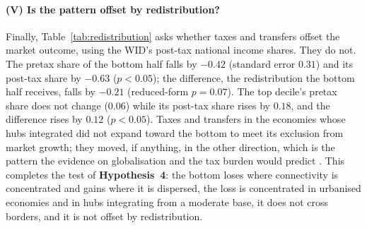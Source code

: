 \paragraph{(V) Is the pattern offset by redistribution?}
Finally, Table~\ref{tab:redistribution} asks whether taxes and transfers offset the market outcome, using the WID's post-tax national income shares. They do not. The pretax share of the bottom half falls by $-0.42$ (standard error $0.31$) and its post-tax share by $-0.63$ ($p<0.05$); the difference, the redistribution the bottom half receives, falls by $-0.21$ (reduced-form $p=0.07$). The top decile's pretax share does not change ($0.06$) while its post-tax share rises by $0.18$, and the difference rises by $0.12$ ($p<0.05$). Taxes and transfers in the economies whose hubs integrated did not expand toward the bottom to meet its exclusion from market growth; they moved, if anything, in the other direction, which is the pattern the evidence on globalisation and the tax burden would predict \citep{Egger_2019,Kleven_2013}. This completes the test of \textbf{Hypothesis~4}: the bottom loses where connectivity is concentrated and gains where it is dispersed, the loss is concentrated in urbanised economies and in hubs integrating from a moderate base, it does not cross borders, and it is not offset by redistribution.

